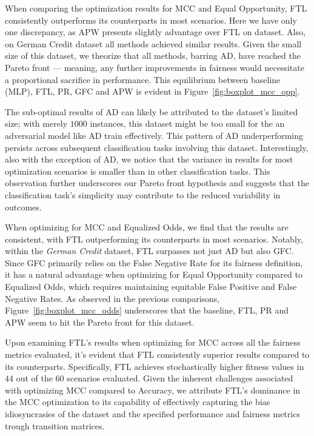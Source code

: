 When comparing the optimization results for MCC and Equal Opportunity, FTL consistently outperforms its counterparts in most scenarios. Here we have only one discrepancy, as APW presents slightly advantage over FTL on  dataset. Also, on German Credit dataset all methods achieved similar results. Given the small size of this dataset, we theorize that all methods, barring AD, have reached the Pareto front — meaning, any further improvements in fairness would necessitate a proportional sacrifice in performance. This equilibrium between baseline (MLP), FTL, PR, GFC and APW is evident in Figure~\ref{fig:boxplot_mcc_opp}.

The sub-optimal results of AD can likely be attributed to the dataset's limited size; with merely $1000$ instances, this dataset might be too small for the an adversarial model like AD train effectively. This pattern of AD underperforming persists across subsequent classification tasks involving this dataset. Interestingly, also with the exception of AD, we notice that the variance in results for most optimization scenarios is smaller than in other classification tasks. This observation further underscores our Pareto front hypothesis and suggests that the classification task's simplicity may contribute to the reduced variability in outcomes.

When optimizing for MCC and Equalized Odds, we find that the results are consistent, with FTL outperforming its counterparts in most scenarios. Notably, within the \textit{German Credit} dataset, FTL surpasses not just AD but also GFC. Since GFC primarily relies on the False Negative Rate for its fairness definition, it has a natural advantage when optimizing for Equal Opportunity compared to Equalized Odds, which requires maintaining equitable False Positive and False Negative Rates. As observed in the previous comparisons, Figure~\ref{fig:boxplot_mcc_odds} underscores that the baseline, FTL, PR and APW seem to hit the Pareto front for this dataset.

Upon examining FTL's results when optimizing for MCC across all the fairness metrics evaluated, it's evident that FTL consistently  superior results compared to its counterparts. Specifically, FTL achieves stochastically higher fitness values in $44$ out of the $60$ scenarios evaluated. Given the inherent challenges associated with optimizing MCC compared to Accuracy, we attribute FTL's dominance in the MCC optimization to its capability of effectively capturing the bias idiosyncrasies of the dataset and the specified performance and fairness metrics trough transition matrices.

